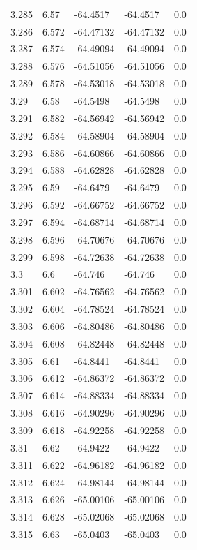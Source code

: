 \begin{tabular}{lllll}
3.285 & 6.57 & -64.4517 & -64.4517 & 0.0 \\
3.286 & 6.572 & -64.47132 & -64.47132 & 0.0 \\
3.287 & 6.574 & -64.49094 & -64.49094 & 0.0 \\
3.288 & 6.576 & -64.51056 & -64.51056 & 0.0 \\
3.289 & 6.578 & -64.53018 & -64.53018 & 0.0 \\
3.29 & 6.58 & -64.5498 & -64.5498 & 0.0 \\
3.291 & 6.582 & -64.56942 & -64.56942 & 0.0 \\
3.292 & 6.584 & -64.58904 & -64.58904 & 0.0 \\
3.293 & 6.586 & -64.60866 & -64.60866 & 0.0 \\
3.294 & 6.588 & -64.62828 & -64.62828 & 0.0 \\
3.295 & 6.59 & -64.6479 & -64.6479 & 0.0 \\
3.296 & 6.592 & -64.66752 & -64.66752 & 0.0 \\
3.297 & 6.594 & -64.68714 & -64.68714 & 0.0 \\
3.298 & 6.596 & -64.70676 & -64.70676 & 0.0 \\
3.299 & 6.598 & -64.72638 & -64.72638 & 0.0 \\
3.3 & 6.6 & -64.746 & -64.746 & 0.0 \\
3.301 & 6.602 & -64.76562 & -64.76562 & 0.0 \\
3.302 & 6.604 & -64.78524 & -64.78524 & 0.0 \\
3.303 & 6.606 & -64.80486 & -64.80486 & 0.0 \\
3.304 & 6.608 & -64.82448 & -64.82448 & 0.0 \\
3.305 & 6.61 & -64.8441 & -64.8441 & 0.0 \\
3.306 & 6.612 & -64.86372 & -64.86372 & 0.0 \\
3.307 & 6.614 & -64.88334 & -64.88334 & 0.0 \\
3.308 & 6.616 & -64.90296 & -64.90296 & 0.0 \\
3.309 & 6.618 & -64.92258 & -64.92258 & 0.0 \\
3.31 & 6.62 & -64.9422 & -64.9422 & 0.0 \\
3.311 & 6.622 & -64.96182 & -64.96182 & 0.0 \\
3.312 & 6.624 & -64.98144 & -64.98144 & 0.0 \\
3.313 & 6.626 & -65.00106 & -65.00106 & 0.0 \\
3.314 & 6.628 & -65.02068 & -65.02068 & 0.0 \\
3.315 & 6.63 & -65.0403 & -65.0403 & 0.0 \\

\end{tabular}
